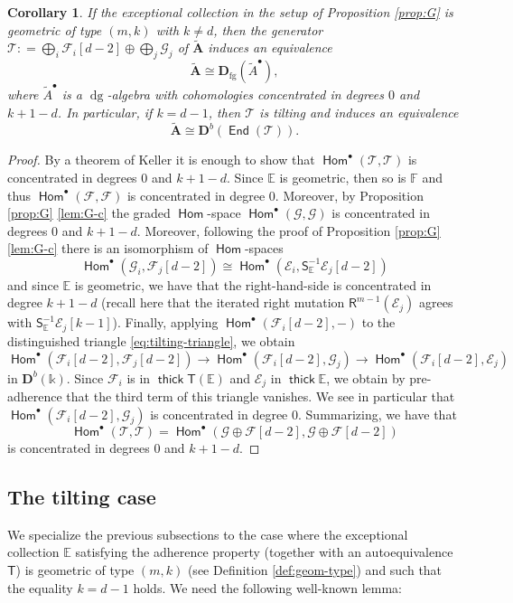 \documentclass[a4paper,11pt, reqno]{amsart}
\def\E{\mathbb E}
\def\F{\mathbb F}
\def\AA{\mathbf A}
\def\DD{\mathbf D}
\def\sE{\mathscr{E}}
\def\sF{\mathscr{F}}
\def\sG{\mathscr{G}}
\def\sT{\mathscr{T}}
\def\dg{{\operatorname{dg}}}
\newcommand{\opname}[1]{\operatorname{\mathsf{#1}}}
\newcommand{\Hom}{\opname{Hom}}
\newcommand{\End}{\opname{End}}
\newcommand{\thick}{\opname{thick}\nolimits}
\def\Db{\DD^b}
\newcommand{\bR}{\mathsf{R}}
\newcommand{\bS}{\mathsf{S}}
\newcommand{\bT}{\mathsf{T}}
\theoremstyle{plain}
\newtheorem{corollary}[dummy]{Corollary}
\theoremstyle{definition}
\numberwithin{equation}{section}
\begin{document}
\begin{corollary}\label{cor:tilting}
If the exceptional collection in the setup of Proposition \ref{prop:G} is geometric of type $(m,k)$ with $k\neq d$, then the generator $\sT : = \bigoplus_i \sF_i [d-2] \oplus \bigoplus_j \sG_j $ of $\tilde{\AA}$  induces an equivalence 
\[
\tilde{\AA} \cong \DD_{\mathrm{fg}} ( \tilde{A}^\bullet ) ,
\]
where $\tilde{A}^\bullet$ is a $\dg$-algebra with cohomologies concentrated in degrees $0$ and $k+1-d$.
In particular, if $k=d-1$, then $\sT$ is tilting and induces an equivalence
\[
\tilde{\AA} \cong \Db ( \End( \sT ) ) .
\]
\end{corollary}

\begin{proof}
By a theorem of Keller \cite[Theorem in section 8.7]{keller} it is enough to show that $\Hom^\bullet ( \sT , \sT )$ is concentrated in degrees $0$ and $k+1-d$.
Since $\E$ is geometric, then so is $\F$ and thus $\Hom^\bullet ( \sF , \sF )$ is concentrated in degree $0$.
Moreover, by Proposition \ref{prop:G} \eqref{lem:G-c} the graded $\Hom$-space $\Hom^\bullet ( \sG , \sG )$ is concentrated in degrees $0$ and $k+1-d$.
Moreover, following the proof of Proposition \ref{prop:G} \eqref{lem:G-c} there is an isomorphism of $\Hom$-spaces
\[
\Hom^\bullet ( \sG_i , \sF_j [d-2] ) \cong \Hom^\bullet ( \sE_i , \bS^{-1}_{\E} \sE_j [d-2] ) 
\]
and since $\E$ is geometric, we have that the right-hand-side is concentrated in degree $k+1-d$ (recall here that the iterated right mutation $\bR^{m-1} ( \sE_j )$ agrees with $\bS^{-1}_{\E} \sE_j [k-1]$).
Finally, applying $\Hom^\bullet ( \sF_i [d-2] , - )$ to the distinguished triangle \eqref{eq:tilting-triangle}, we obtain 
\[
\Hom^\bullet ( \sF_i [d-2] , \sF_j [d-2] ) \to \Hom^\bullet ( \sF_i [d-2] , \sG_j  ) \to \Hom^\bullet (  \sF_i [d-2] , \sE_j )
\]
in $\Db(\mathbb{k})$.
Since $\sF_i $ is in $\thick\bT ( \E )$ and $\sE_j$ in $\thick\E$, we obtain by pre-adherence that the third term of this triangle vanishes.
We see in particular that $\Hom^\bullet ( \sF_i [d-2] , \sG_j  )$ is concentrated in degree $0$.
Summarizing, we have that 
\[
\Hom^\bullet ( \sT , \sT ) = \Hom^\bullet ( \sG \oplus \sF [d-2] , \sG \oplus \sF [d-2] ) 
\]
is concentrated in degrees $0$ and $k+1-d$.
\end{proof}



\subsection{The tilting case}
We specialize the previous subsections to the case where the exceptional collection $\E$ satisfying the adherence property (together with an autoequivalence $\bT$) is geometric of type $(m,k)$ (see Definition \eqref{def:geom-type}) and such that the equality $k = d-1$ holds.
We need the following well-known lemma:
\end{document}
